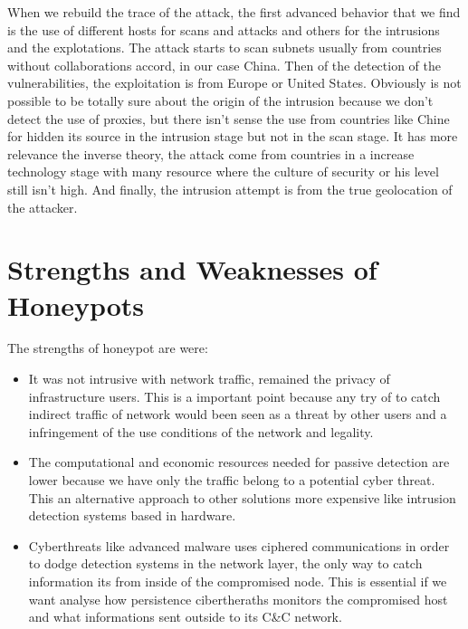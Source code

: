 \documentclass[a4paper]{llncs}
\begin{document}
When we rebuild the trace of the attack, the first advanced behavior that we find is the use of different hosts for scans and attacks and others for the intrusions and the explotations. The attack starts to scan subnets usually from countries without collaborations accord, in our case China. Then of the detection of the vulnerabilities, the exploitation is from Europe or United States. Obviously is not possible to be totally sure about the origin of the intrusion because we don't detect the use of proxies, but there isn't sense the use from countries like Chine for hidden its source in the intrusion stage but not in the scan stage. It has more relevance the inverse theory, the attack come from countries in a increase technology stage with many resource where the culture of security or his level still isn't high. And finally, the intrusion attempt is from the true geolocation of the attacker.

\section{Strengths and Weaknesses of Honeypots}
The strengths of honeypot are were:
\begin{itemize}
\item It was not intrusive with network traffic, remained the privacy of infrastructure users. This is a important point because any try of to catch indirect traffic of network would been seen as a threat by other users and a infringement of the use conditions of the network and legality.
\item The computational and economic resources needed for passive detection are lower because we have only the traffic belong to a potential cyber threat. This an alternative approach to other solutions more expensive like intrusion detection systems based in hardware.
\item Cyberthreats like advanced malware uses ciphered communications in order to dodge detection systems in the network layer, the only way to catch information its from inside of the compromised node. This is essential if we want analyse how persistence cibertheraths monitors the compromised host and what informations sent outside to its C\&C network.
\end{itemize}
\end{document}
